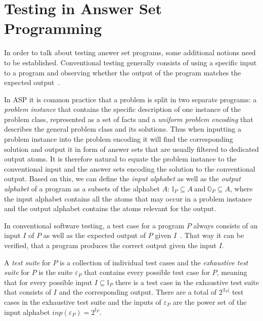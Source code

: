 \section{Testing in Answer Set Programming}
\label{sec:Preliminaries on answer set programming/Testing in Answer Set Programming}
In order to talk about testing answer set programs, some additional notions need to be established. Conventional testing generally consists of using a specific input to a program and observing whether the output of the program matches the expected output~\cite[71\psqq]{AO16}.

In ASP it is common practice that a problem is split in two separate programs: a \emph{problem instance} that contains the specific description of one instance of the problem class, represented as a set of facts and a \emph{uniform problem encoding} that describes the general problem class and its solutions. Thus when inputting a problem instance into the problem encoding it will find the corresponding solution and output it in form of answer sets that are usually filtered to dedicated output atoms. It is therefore natural to equate the problem instance to the conventional input and the answer sets encoding the solution to the conventional output. Based on this, we can define the \emph{input alphabet} as well as the \emph{output alphabet} of a program as a subsets of the alphabet $A$: \(\mathbb{I}_P \subseteq A\ \text{and}\ \mathbb{O}_P \subseteq A\), where the input alphabet contains all the atoms that may occur in a problem instance and the output alphabet contains the atoms relevant for the output.

In conventional software testing, a test case for a program $P$ always consists of an input $I$ of $P$ as well as the expected output of $P$ given $I$~\cite{MB12}. That way it can be verified, that a program produces the correct output given the input $I$.

A \emph{test suite} for $P$ is a collection of individual test cases and the \emph{exhaustive test suite} for $P$ is the suite \(\varepsilon_P\) that contains every possible test case for $P$, meaning that for every possible input \(I \subseteq \mathbb{I}_P\) there is a test case in the exhaustive test suite that consists of $I$ and the corresponding output. There are a total of \(2^{|\mathbb{I}_P|}\) test cases in the exhaustive test suite and the inputs of $\varepsilon_P$ are the power set of the input alphabet \(inp(\varepsilon_P) = 2^{\mathbb{I}_P}\).

